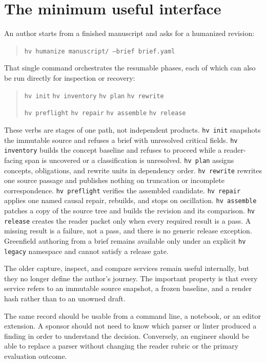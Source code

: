 \section{The minimum useful interface}

An author starts from a finished manuscript and asks for a humanized revision:

\begin{quote}\small
\texttt{hv humanize manuscript/ --brief brief.yaml}
\end{quote}

That single command orchestrates the resumable phases, each of which can also be
run directly for inspection or recovery:

\begin{quote}\small
\texttt{hv init} \quad \texttt{hv inventory} \quad \texttt{hv plan} \quad
\texttt{hv rewrite}\par
\texttt{hv preflight} \quad \texttt{hv repair} \quad \texttt{hv assemble} \quad
\texttt{hv release}
\end{quote}

These verbs are stages of one path, not independent products. \texttt{hv init}
snapshots the immutable source and refuses a brief with unresolved critical
fields. \texttt{hv inventory} builds the concept baseline and refuses to proceed
while a reader-facing span is uncovered or a classification is unresolved.
\texttt{hv plan} assigns concepts, obligations, and rewrite units in dependency
order. \texttt{hv rewrite} rewrites one source passage and publishes nothing on
truncation or incomplete correspondence. \texttt{hv preflight} verifies the
assembled candidate. \texttt{hv repair} applies one named causal repair,
rebuilds, and stops on oscillation. \texttt{hv assemble} patches a copy of the
source tree and builds the revision and its comparison. \texttt{hv release}
creates the reader packet only when every required result is a pass. A missing
result is a failure, not a pass, and there is no generic release exception.
Greenfield authoring from a brief remains available only under an explicit
\texttt{hv legacy} namespace and cannot satisfy a release gate.

The older capture, inspect, and compare services remain useful internally, but
they no longer define the author's journey. The important property is that every
service refers to an immutable source snapshot, a frozen baseline, and a render
hash rather than to an unowned draft.

The same record should be usable from a command line, a notebook, or an editor
extension. A sponsor should not need to know which parser or linter produced a
finding in order to understand the decision. Conversely, an engineer should
be able to replace a parser without changing the reader rubric or the primary
evaluation outcome.

